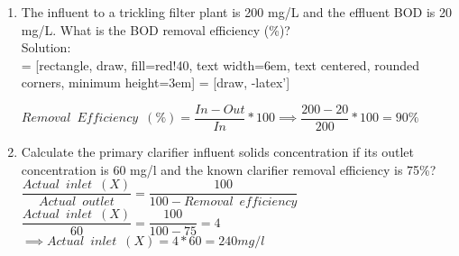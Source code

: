 \documentclass{article}
\begin{document}
\begin{enumerate}

\item The influent to a trickling filter plant is 200 mg/L and the effluent BOD is 20 mg/L. What is the BOD removal efficiency (\%)?\\
Solution:\\
\vspace{0.3cm}
 = [rectangle, draw, fill=red!40, 
    text width=6em, text centered, rounded corners, minimum height=3em]
 = [draw, -latex']
\begin{figure}[!h]
\centering
{}
\end{figure}
\vspace{0.5cm}
$Removal \enspace Efficiency \enspace (\%) = \dfrac{In-Out}{In}*100 \implies \dfrac{200-20}{200}*100=\boxed{90\%}$




\item Calculate the primary clarifier influent solids concentration if its outlet concentration is 60 mg/l and the known clarifier removal efficiency is 75\%?\\
$\dfrac{Actual \enspace  inlet \enspace (X)}{Actual \enspace outlet}=\dfrac{100}{100-Removal \enspace efficiency}$\\ 
$\dfrac{Actual \enspace  inlet \enspace (X)}{60}=\dfrac{100}{100-75}=4$\\
$\implies Actual \enspace inlet \enspace (X)=4*60 = \boxed{240 mg/l}$\\


\end{enumerate}
\end{document}
